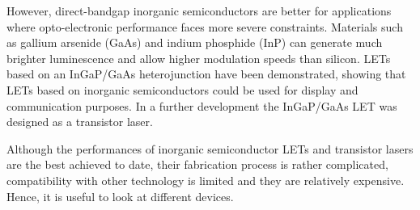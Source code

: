 However, direct-bandgap inorganic semiconductors are better for applications where opto-electronic performance faces more severe constraints. Materials such as gallium arsenide (GaAs) and indium phosphide (InP) can generate much brighter luminescence and allow higher modulation speeds than silicon. LETs based on an InGaP/GaAs heterojunction have been demonstrated, showing that LETs based on inorganic semiconductors could be used for display and communication purposes. In a further development the InGaP/GaAs LET was designed as a transistor laser.

Although the performances of inorganic semiconductor LETs and transistor lasers are the best achieved to date, their fabrication process is rather complicated, compatibility with other technology is limited and they are relatively expensive. Hence, it is useful to look at different devices.
